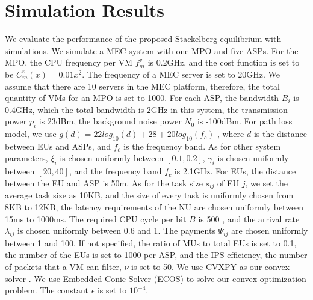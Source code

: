 \documentclass[10pt,journal, compsoc]{IEEEtran}
\begin{document}
\section{Simulation Results} \label{sec:simulation}
We evaluate the performance of the proposed Stackelberg equilibrium with simulations. We simulate a MEC system with one MPO and five ASPs\cite{Zhang3}. For the MPO, the CPU frequency per VM $f_m^v$ is 0.2GHz, and the cost function is set to be $C_m^v(x) = 0.01x^2$. The frequency of a MEC server is set to 20GHz\cite{Liu4}. We assume that there are 10 servers in the MEC platform, therefore, the total quantity of VMs for an MPO is set to 1000. For each ASP, the bandwidth $B_i$ is 0.4GHz, which the total bandwidth is 2GHz in this system, the transmission power $p_i$ is 23dBm\cite{3gpp.36.101}, the background noise power $N_0$ is -100dBm\cite{chen2015efficient}. For path loss model, we use $g(d)=22log_{10}(d)+28+20log_{10}(f_c)$ \cite{3gpp.36.814}, where $d$ is the distance between EUs and ASPs, and $f_c$ is the frequency band. As for other system parameters, $\xi_{i}$ is chosen uniformly between $[0.1, 0.2]$, $\gamma_i$ is chosen uniformly between $[20, 40]$, and the frequency band $f_c$ is 2.1GHz. For EUs, the distance between the EU and ASP is 50m\cite{Mao}. As for the task size $s_{ij}$ of EU $j$, we set the average task size as 10KB\cite{Ko}, and the size of every task is uniformly chosen from 8KB to 12KB, the latency requirements of the NU are chosen uniformly between 15ms to 1000ms. The required CPU cycle per bit $B$ is 500 \cite{Ko}, and the arrival rate $\lambda_{ij}$ is chosen uniformly between 0.6 and 1\cite{Wu}. The payments $\Psi_{ij}$ are chosen uniformly between 1 and 100. If not specified, the ratio of MUs to total EUs is set to 0.1, the number of the EUs is set to 1000 per ASP, and the IPS efficiency, the number of packets that a VM can filter, $\nu$ is set to 50. We use CVXPY \cite{diamond2016cvxpy} \cite{agrawal2018rewriting} as our convex solver . We use Embedded Conic Solver (ECOS) \cite{bib:Domahidi2013ecos} to solve our convex optimization problem. The constant $\epsilon$ is set to $10^{-4}$. 
\end{document}
